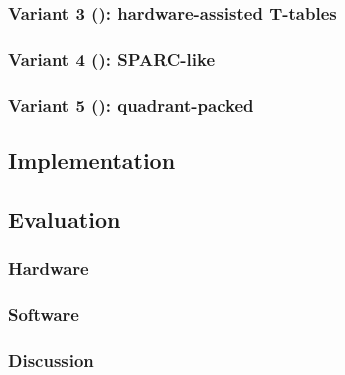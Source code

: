 \documentclass[preprint]{iacrtrans}
\begin{document}
\subsubsection{Variant 3 (): hardware-assisted T-tables}
\label{sec:ise:design:v3}

\subsubsection{Variant 4 (): SPARC-like}
\label{sec:ise:design:v4}

\subsubsection{Variant 5 (): quadrant-packed}
\label{sec:ise:design:v5}



\subsection{Implementation}
\label{sec:ise:imp}



\subsection{Evaluation}

\subsubsection{Hardware}
\label{sec:ise:eval:hw}


\subsubsection{Software}
\label{sec:ise:eval:sw}


\subsubsection{Discussion}
\label{sec:ise:eval:discuss}


\end{document}
